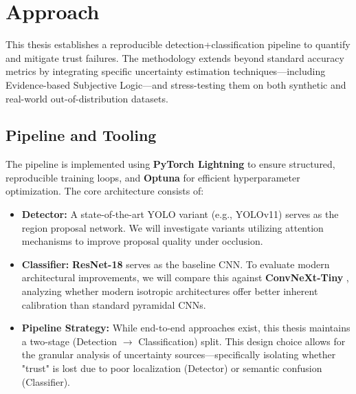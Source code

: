 \documentclass[11pt,a4paper]{article}
\begin{document}
\section{Approach}

This thesis establishes a reproducible detection+classification pipeline to quantify and mitigate trust failures. The methodology extends beyond standard accuracy metrics by integrating specific uncertainty estimation techniques—including Evidence-based Subjective Logic—and stress-testing them on both synthetic and real-world out-of-distribution datasets.

\subsection{Pipeline and Tooling}
The pipeline is implemented using \textbf{PyTorch Lightning} to ensure structured, reproducible training loops, and \textbf{Optuna} for efficient hyperparameter optimization.
The core architecture consists of:
\begin{itemize}
    \item \textbf{Detector:} A state-of-the-art YOLO variant (e.g., YOLOv11) serves as the region proposal network. We will investigate variants utilizing attention mechanisms to improve proposal quality under occlusion.
    \item \textbf{Classifier:} \textbf{ResNet-18} serves as the baseline CNN. To evaluate modern architectural improvements, we will compare this against \textbf{ConvNeXt-Tiny} \cite{liu2022convnext}, analyzing whether modern isotropic architectures offer better inherent calibration than standard pyramidal CNNs.
    \item \textbf{Pipeline Strategy:} While end-to-end approaches exist, this thesis maintains a two-stage (Detection $\rightarrow$ Classification) split. This design choice allows for the granular analysis of uncertainty sources—specifically isolating whether "trust" is lost due to poor localization (Detector) or semantic confusion (Classifier).
\end{itemize}
\end{document}
